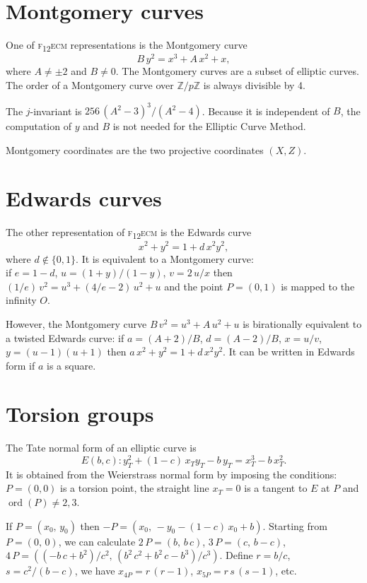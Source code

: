 \documentclass[a4paper, 11pt, pdftex]{report}
\theoremstyle{plain}
\theoremstyle{definition}
\DeclareMathOperator{\ord}{ord}
\begin{document}
\section{Montgomery curves}

One of {\scshape f\textsubscript{12}ecm} representations is the Montgomery curve
$$B\,y^2 = x^3 + A\,x^2 + x,$$
where $A \neq \pm2$ and $B \neq 0$. 
The Montgomery curves are a subset of elliptic curves. The order of a Montgomery curve over
$\mathbb{Z}/p\mathbb{Z}$ is always divisible by 4.

The $j$-invariant is $256\,(A^2 - 3)^3 / (A^2 - 4)$. Because it is independent of $B$,
the computation of $y$ and $B$ is not needed for the Elliptic Curve Method.

Montgomery coordinates are the two projective coordinates $(X, Z)$.

\section{Edwards curves}

The other representation of {\scshape f\textsubscript{12}ecm} is the Edwards curve
$$x^2 + y^2 = 1 + d\,x^2y^2,$$
where $d \not\in \{0, 1\}$. It is equivalent to a Montgomery curve:\\
if $e = 1 - d$, $u = (1 + y)/(1 - y)$, $v = 2\,u / x$ then $(1/e)\,v^2 = u^3 + (4/e - 2)\,u^2 + u$
and the point $P = (0, 1)$ is mapped to the infinity $O$.

However, the Montgomery curve $B\,v^2 = u^3 + A\,u^2 + u$ is birationally equivalent to a
twisted Edwards curve:
if $a = (A + 2) / B$, $d = (A - 2) / B$, $x = u / v$, $y = (u - 1)(u + 1)$ then
$a\,x^2 + y^2 = 1 + d\,x^2y^2$. It can be written in Edwards form if $a$ is a square.

\section{Torsion groups}

The Tate normal form of an elliptic curve is
$$E(b, c): y_T^2 + (1 - c)\, x_T y_T - b\,y_T = x_T^3 -  b\, x_T^2.$$
It is  obtained from the  Weierstrass normal form by  imposing the conditions: $P = (0, 0)$ is a
torsion point, the straight line $x_T = 0$ is a tangent to $E$ at $P$ and $\ord(P)\neq 2 ,3$.

If $P = (x_0,\, y_0)$ then $-P = (x_0,\, -y_0 - (1 - c)\, x_0 + b)$.
Starting from $P = (0,\, 0)$, we can calculate
$2\,P = \left(b,\, b\,c\right)$, $3\,P = \left(c,\, b - c\right)$,
$4\,P = \left((-b\,c + b^2)/c^2,\, (b^2\,c^2 + b^2\,c - b^3)/c^3\right)$. Define $r = b/c$,
$s = c^2/(b - c)$, we have $x_{4P} = r\,(r - 1)$, $x_{5P} = r\,s\,(s - 1)$, etc.
\end{document}
